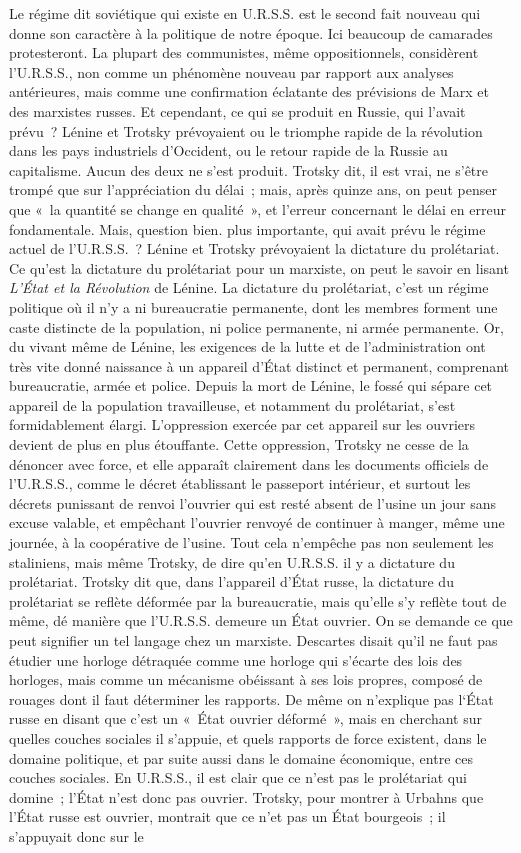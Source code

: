 \documentclass[french,twoside]{book} %
\begin{document}
Le régime dit soviétique qui existe en U.R.S.S. est le second fait nouveau qui donne son caractère à la politique de notre époque. Ici beaucoup de camarades protesteront. La plupart des communistes, même oppositionnels, considèrent l'U.R.S.S., non comme un phénomène nouveau par rapport aux analyses antérieures, mais comme une confirmation éclatante des prévisions de Marx et des marxistes russes. Et cependant, ce qui se produit en Russie, qui l'avait prévu ? Lénine et Trotsky prévoyaient ou le triomphe rapide de la révolution dans les pays industriels d'Occident, ou le retour rapide de la Russie au capitalisme. Aucun des deux ne s'est produit. Trotsky dit, il est vrai, ne s'être trompé que sur l'appréciation du délai ; mais, après quinze ans, on peut penser que « la quantité se change en qualité », et l'erreur concernant le délai en erreur fondamentale. Mais, question bien. plus importante, qui avait prévu le régime actuel de l'U.R.S.S. ? Lénine et Trotsky prévoyaient la dictature du prolétariat. Ce qu'est la dictature du prolétariat pour un marxiste, on peut le savoir en lisant {\itshape L’État et la Révolution} de Lénine. La dictature du prolétariat, c'est un régime politique où il n'y a ni bureaucratie permanente, dont les membres forment une caste distincte de la population, ni police permanente, ni armée permanente. Or, du vivant même de Lénine, les exigences de la lutte et de l'administration ont très vite donné naissance à un appareil d'État distinct et permanent, comprenant bureaucratie, armée et police. Depuis la mort de Lénine, le fossé qui sépare cet appareil de la population travailleuse, et notamment du prolétariat, s'est formidablement élargi. L'oppression exercée par cet appareil sur les ouvriers devient de plus en plus étouffante. Cette oppression, Trotsky ne cesse de la dénoncer avec force, et elle apparaît clairement dans les documents officiels de l'U.R.S.S., comme le décret établissant le passeport intérieur, et surtout les décrets punissant de renvoi l'ouvrier qui est resté absent de l'usine un jour sans excuse valable, et empêchant l'ouvrier renvoyé de continuer à manger, même une journée, à la coopérative de l'usine. Tout cela n'empêche pas non seulement les staliniens, mais même Trotsky, de dire qu'en U.R.S.S. il y a dictature du prolétariat. Trotsky dit que, dans l'appareil d'État russe, la dictature du prolétariat se reflète déformée par la bureaucratie, mais qu'elle s'y reflète tout de même, dé manière que l'U.R.S.S. demeure un État ouvrier. On se demande ce que peut signifier un tel langage chez un marxiste. Descartes disait qu'il ne faut pas étudier une horloge détraquée comme une horloge qui s'écarte des lois des horloges, mais comme un mécanisme obéissant à ses lois propres, composé de rouages dont il faut déterminer les rapports. De même on n'explique pas l‘État russe en disant que c'est un « État ouvrier déformé », mais en cherchant sur quelles couches sociales il s'appuie, et quels rapports de force existent, dans le domaine politique, et par suite aussi dans le domaine économique, entre ces couches sociales. En U.R.S.S., il est clair que ce n'est pas le prolétariat qui domine ; l’État n'est donc pas ouvrier. Trotsky, pour montrer à Urbahns que l’État russe est ouvrier, montrait que ce n'et pas un État bourgeois ; il s'appuyait donc sur le 
\end{document}
